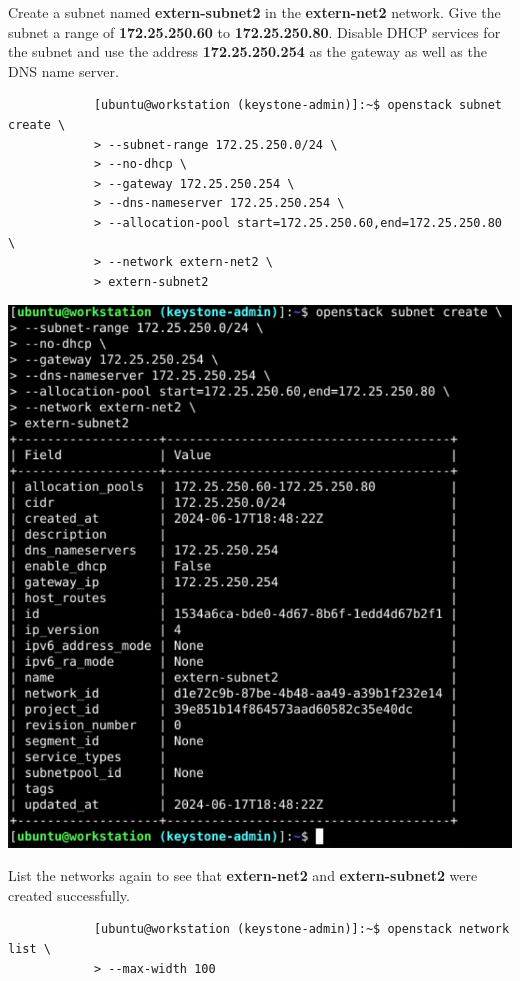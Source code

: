 \documentclass[letterpaper, 12pt]{article}
\begin{document}
\begin{enumerate}
    \begin{labstep}
        Create a subnet named \textbf{extern-subnet2} in the \textbf{extern-net2} network.
        Give the subnet a range of \textbf{172.25.250.60} to \textbf{172.25.250.80}.
        Disable DHCP services for the subnet and use the address \textbf{172.25.250.254} as the gateway as well as the DNS name server.
        \begin{lstlisting}
            [ubuntu@workstation (keystone-admin)]:~$ openstack subnet create \
            > --subnet-range 172.25.250.0/24 \
            > --no-dhcp \
            > --gateway 172.25.250.254 \
            > --dns-nameserver 172.25.250.254 \
            > --allocation-pool start=172.25.250.60,end=172.25.250.80 \
            > --network extern-net2 \
            > extern-subnet2
        \end{lstlisting}

        \begin{center}
            \includegraphics[width=\linewidth]{images/part1/step16.png}
        \end{center}
    \end{labstep}

    \begin{labstep}
        List the networks again to see that \textbf{extern-net2} and \textbf{extern-subnet2} were created successfully.
        \begin{lstlisting}
            [ubuntu@workstation (keystone-admin)]:~$ openstack network list \
            > --max-width 100
        \end{lstlisting}


\end{labstep}
\end{enumerate}
\end{document}
